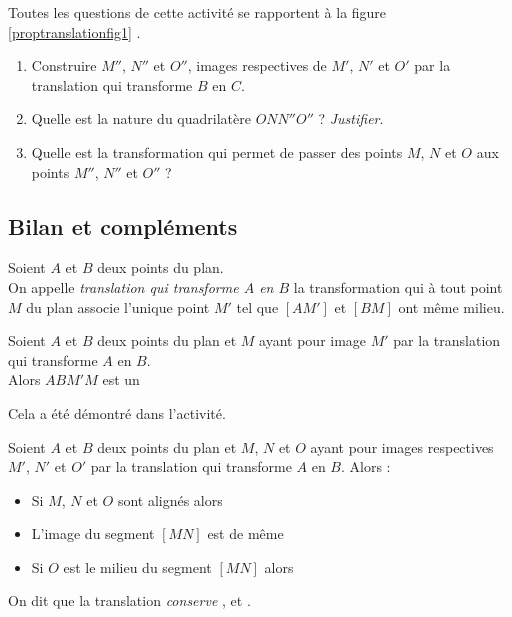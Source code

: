 \begin{act}
\begin{enumerate}
	\end{enumerate}
\end{act}

\begin{act}\label{translationcomposition}
 Toutes les questions de cette activit\'e se rapportent \`a la figure \ref{proptranslationfig1} .
  \begin{enumerate}
   \item Construire $M''$, $N''$ et $O''$, images respectives de $M'$, $N'$ et $O'$ par la translation qui transforme $B$ en $C$. 
   \item Quelle est la nature du quadrilat\`ere $ONN''O''$ ? \emph{Justifier}.
   \item Quelle est la transformation qui permet de passer des points $M$, $N$ et $O$ aux points $M''$, $N''$ et $O''$ ?
  \end{enumerate}

\end{act}



\subsection{Bilan et compl\'ements}

\begin{definition}[Rappel]
 Soient $A$ et $B$ deux points du plan.\\
  On appelle \emph{translation qui transforme $A$ en $B$} la transformation qui \`a tout point $M$ du plan associe l'unique point $M'$ tel que $[AM']$ et $[BM]$ ont m\^eme milieu.
\end{definition}

\begin{prop}
 Soient $A$ et $B$ deux points du plan et $M$ ayant pour image $M'$ par la translation qui transforme $A$ en $B$.\\
 Alors $ABM'M$ est un \dotfill
\end{prop}

Cela a \'et\'e d\'emontr\'e dans l'activit\'e.

\begin{prop}
 Soient $A$ et $B$ deux points du plan et $M$, $N$ et $O$ ayant pour images respectives $M'$, $N'$ et $O'$ par la translation qui transforme $A$ en $B$. Alors :
  \begin{itemize}
       \item Si $M$, $N$ et $O$ sont align\'es alors \dotfill
       \item L'image du segment $[MN]$ est \dotfill de m\^eme \dotfill
       \item Si $O$ est le milieu du segment $[MN]$ alors \dotfill
  \end{itemize}
 On dit que la translation \emph{conserve} \dotfill, \dotfill et \dotfill.
\end{prop}

